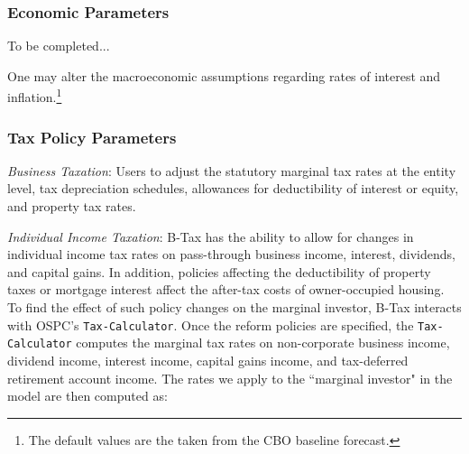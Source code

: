 \documentclass[article,11pt,letterpaper,fleqn]{article}
\theoremstyle{definition}
\numberwithin{equation}{section}
\begin{document}
\subsubsection{Economic Parameters}

To be completed...

One may alter the macroeconomic assumptions regarding rates of interest and inflation.\footnote{The default values are the taken from the CBO baseline forecast.}  


\subsubsection{Tax Policy Parameters}

\emph{Business Taxation}: Users to adjust the statutory marginal tax rates at the entity level, tax depreciation schedules, allowances for deductibility of interest or equity, and property tax rates.  

\emph{Individual Income Taxation}: B-Tax has the ability to allow for changes in individual income tax rates on pass-through business income, interest, dividends, and capital gains.  In addition, policies affecting the deductibility of property taxes or mortgage interest affect the after-tax costs of owner-occupied housing.  To find the effect of such policy changes on the marginal investor, B-Tax interacts with OSPC's \texttt{Tax-Calculator}. Once the reform policies are specified, the \texttt{Tax-Calculator} computes the marginal tax rates on non-corporate business income, dividend income, interest income, capital gains income, and tax-deferred retirement account income.  The rates we apply to the ``marginal investor" in the model are then computed as: 
\end{document}
